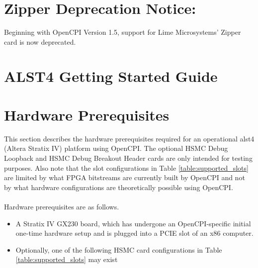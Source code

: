 \documentclass{article}
\begin{document}
\section*{Zipper Deprecation Notice:}
Beginning with OpenCPI Version 1.5, support for Lime Microsystems' Zipper card is now deprecated.

\section*{ALST4 Getting Started Guide}
\setcounter{section}{0}

\section{Hardware Prerequisites}
This section describes the hardware prerequisites required for an operational alst4 (Altera Stratix IV) platform using OpenCPI. The optional HSMC Debug Loopback and HSMC Debug Breakout Header cards are only intended for testing purposes. Also note that the slot configurations in Table \ref{table:supported_slots} are limited by what FPGA bitstreams are currently built by OpenCPI and not by what hardware configurations are theoretically possible using OpenCPI.\\ \\
Hardware prerequisites are as follows.
\begin{itemize}
\item A Stratix IV GX230 board, which has undergone an OpenCPI-specific initial one-time hardware setup \cite{alst4_hardware_setup} and is plugged into a PCIE slot of an x86 computer.
\item Optionally, one of the following HSMC card configurations in Table  \ref{table:supported_slots} may exist
\end{itemize}
\end{document}
